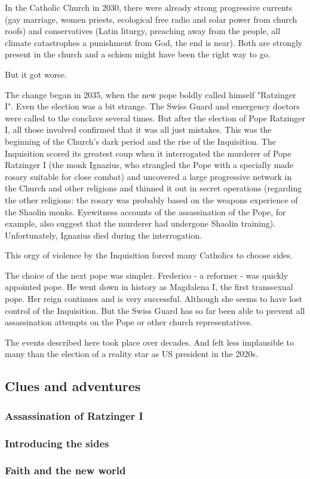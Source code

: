 In the Catholic Church in 2030, there were already strong progressive currents (gay marriage, women priests, ecological free radio and solar power from church roofs) and conservatives (Latin liturgy, preaching away from the people, all climate catastrophes a punishment from God, the end is near). Both are strongly present in the church and a schism might have been the right way to go.

But it got worse.

The change began in 2035, when the new pope boldly called himself "Ratzinger I". Even the election was a bit strange. The Swiss Guard and emergency doctors were called to the conclave several times. But after the election of Pope Ratzinger I, all those involved confirmed that it was all just mistakes. This was the beginning of the Church's dark period and the rise of the Inquisition. The Inquisition scored its greatest coup when it interrogated the murderer of Pope Ratzinger I (the monk Ignazius, who strangled the Pope with a specially made rosary suitable for close combat) and uncovered a large progressive network in the Church and other religions and thinned it out in secret operations (regarding the other religions: the rosary was probably based on the weapons experience of the Shaolin monks. Eyewitness accounts of the assassination of the Pope, for example, also suggest that the murderer had undergone Shaolin training). Unfortunately, Ignazius died during the interrogation.

This orgy of violence by the Inquisition forced many Catholics to choose sides.

The choice of the next pope was simpler. Frederico - a reformer - was quickly appointed pope. He went down in history as Magdalena I, the first transsexual pope. Her reign continues and is very successful. Although she seems to have lost control of the Inquisition. But the Swiss Guard has so far been able to prevent all assassination attempts on the Pope or other church representatives.

The events described here took place over decades. And felt less implausible to many than the election of a reality star as US president in the 2020s.

\subsection{Clues and adventures}

\subsubsection{Assassination of Ratzinger I}

\subsubsection{Introducing the sides}

\subsubsection{Faith and the new world}







